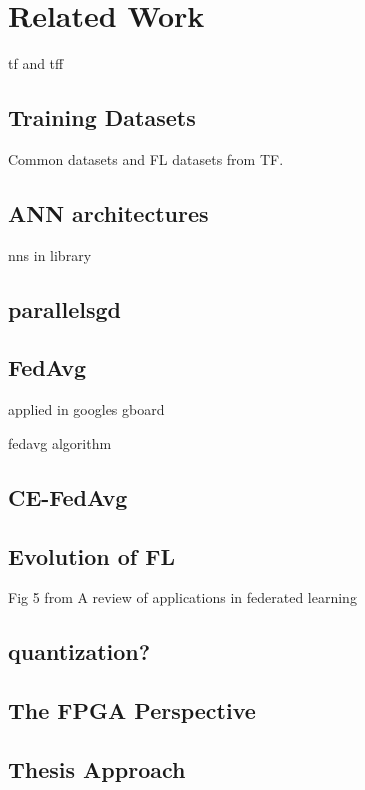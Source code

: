 \chapter{Related Work}
\label{Chapter-Related-Work}
tf and tff
\section{Training Datasets}
Common datasets and FL datasets from TF.
\section{ANN architectures}
nns in library

\section{parallelsgd}

\section{FedAvg}
applied in googles gboard

fedavg algorithm

\section{CE-FedAvg}
\section{Evolution of FL}
Fig 5 from A review of applications in federated learning

\section{quantization?}

\section{The FPGA Perspective}
\section{Thesis Approach}
